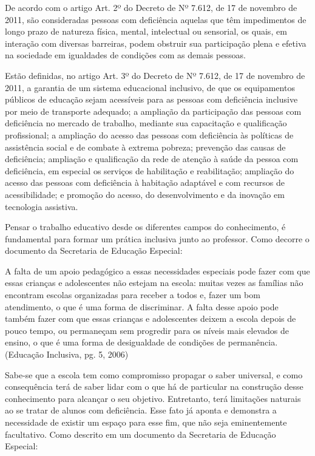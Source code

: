 \documentclass[brasil]{abnt}
\begin{document}
	De acordo com o artigo Art. 2º do Decreto de Nº 7.612, de 17 de novembro de 2011, são consideradas pessoas com deficiência aquelas que têm impedimentos de longo prazo de natureza física, mental, 
	intelectual ou sensorial, os quais, em interação com diversas barreiras, podem obstruir sua participação plena e efetiva na sociedade em igualdades de condições com as demais pessoas. 
	
	Estão definidas, no artigo Art. 3º do Decreto de Nº 7.612, de 17 de novembro de 2011, a garantia de um sistema educacional inclusivo, de que os equipamentos públicos de educação sejam acessíveis para as pessoas 
	com deficiência inclusive por meio de transporte adequado; a ampliação da participação das pessoas com deficiência no mercado de trabalho, mediante sua capacitação e qualificação profissional; a ampliação 
	do acesso das pessoas com deficiência às políticas de assistência social e de combate à extrema pobreza; prevenção das causas de deficiência; ampliação e qualificação da rede de atenção à saúde da pessoa 
	com deficiência, em especial os serviços de habilitação e reabilitação; ampliação do acesso das pessoas com deficiência à habitação adaptável e com recursos de acessibilidade; e promoção do acesso, do 
	desenvolvimento e da inovação em tecnologia assistiva. 
		
	Pensar o trabalho educativo desde os diferentes campos do conhecimento, é fundamental para formar um prática inclusiva junto ao professor. Como decorre o documento da Secretaria de Educação Especial:
	
		\begin{citacao} A falta de um apoio pedagógico a essas necessidades especiais pode fazer com que essas crianças e adolescentes não estejam na escola: muitas vezes as famílias não encontram escolas 
						organizadas para receber a todos e, fazer um bom atendimento, o que é uma forma de discriminar. A falta desse apoio pode também fazer com que essas crianças e adolescentes deixem a escola 
						depois de pouco tempo, ou permaneçam sem progredir para os níveis mais elevados de ensino, o que é uma forma de desigualdade de condições de permanência. (Educação Inclusiva, pg. 5, 2006)
		\end{citacao}

	Sabe-se que a escola tem como compromisso propagar o saber universal, e como consequência terá de saber lidar com o que há de particular na construção desse conhecimento para alcançar o seu objetivo. 
	Entretanto, terá limitações naturais ao se tratar de alunos com deficiência. Esse fato já aponta e demonstra a necessidade de existir um espaço para esse fim, que não seja eminentemente facultativo.
	Como descrito em um documento da Secretaria de Educação Especial:
		
\end{document}
